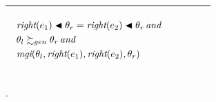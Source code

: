 \documentclass[runningheads]{llncs}
\DeclareMathOperator{\uand}{\emph{and}\,}
\DeclareMathOperator{\rig}{\emph{right}}
\DeclareMathOperator{\mgi}{\emph{mgi}}
\begin{document}
\begin{center}
  \begin{tabular}{|m{}|m{}||m{}|}
\hline
\begin{center}
{$
\begin{aligned}
&\begin{aligned}
&\begin{aligned}
&\rig(\e{1}) \apply \thet{r} = \rig(\e{2}) \apply \thet{r}  \uand  \\
 \,\, &\, \thet{l} \moregen \thet{r}  \uand
\\
  \,\, &\, {\mgi}(\thet{l}, \rig(\e{1}), \rig(\e{2}), \thet{r})
\end{aligned}
\end{aligned}
\end{aligned} $}  \hspace{0cm} 
\end{center}& &  \\  \hline
\end{tabular}.
\end{center}
\end{document}
